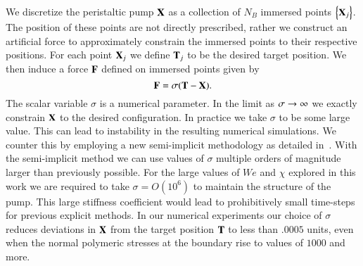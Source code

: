 We discretize the peristaltic pump $\mathbf{X}$ as a collection of $N_B$ immersed points $\left\{\mathbf{X}_j\right\}$. The position of these points are not directly prescribed, rather we construct an artificial force to approximately constrain the immersed points to their respective positions. For each point $\mathbf{X}_j$ we define $\mathbf{T}_j$ to be the desired target position. We then induce a force $\mathbf{F}$ defined on immersed points given by
\begin{equation}
\mathbf{F} = \sigma(\mathbf{T} - \mathbf{X}).
\label{eq:Force}
\end{equation}
The scalar variable $\sigma$ is a numerical parameter. In the limit as $\sigma\rightarrow\infty$ we exactly constrain $\mathbf{X}$ to the desired configuration. In practice we take $\sigma$ to be some large value. This can lead to instability in the resulting numerical simulations. We counter this by employing a new semi-implicit methodology as detailed in~\cite{IBM_Implicit2D, IBM_Implicit3D}. With the semi-implicit method we can use values of $\sigma$ multiple orders of magnitude larger than previously possible. For the large values of $We$ and $\chi$ explored in this work we are required to take $\sigma=O(10^6)$ to maintain the structure of the pump. This large stiffness coefficient would lead to prohibitively small time-steps for previous explicit methods. In our numerical experiments our choice of $\sigma$ reduces deviations in $\mathbf{X}$ from the target position $\mathbf{T}$ to less than $.0005$ units, even when the normal polymeric stresses at the boundary rise to values of $1000$ and more.

